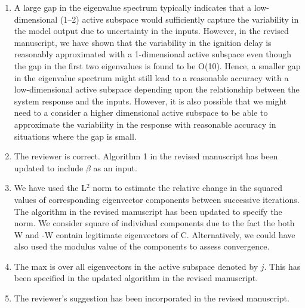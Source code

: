 \documentclass[11pt,final]{article}
\newcommand{\referee}[1]{\vspace{.1ex}\noindent{\textcolor{blue}{#1}}}
\begin{document}
\begin{enumerate}[wide, labelwidth=!, labelindent=0pt]
\item \referee{10.56: what if there is no eigenvalue gap of O(100)?}

\noindent A large gap in the eigenvalue spectrum typically indicates that a low-dimensional (1--2) active subspace 
would sufficiently capture the variability in the model output due to uncertainty in the inputs. However,
in the revised manuscript, we have shown that the variability in the ignition delay is reasonably
approximated with a 1-dimensional active subspace even though the gap in the first two eigenvalues
is found to be O(10). Hence, a smaller gap in the eigenvalue spectrum might still lead to a reasonable
accuracy with a low-dimensional active subspace depending upon the relationship between the
system response and the inputs. However, it is also possible that we might need to a consider a higher 
dimensional active subspace to be able to approximate the variability in the response with reasonable
accuracy in situations where the gap is small. 

\item \referee{11.33: Alg. 1: should have $\beta$ as input, too?}

\noindent The reviewer is correct. Algorithm 1 in the revised manuscript has been updated to include $\beta$
as an input. 

\item \referee{11.42: Which norm is used? Any intuition why squares of W are used, and not just W?}

\noindent We have used the L$^2$ norm to estimate the relative change in the squared values of corresponding
eigenvector components between successive iterations. The algorithm in the revised manuscript has been updated 
to specify the norm. 
We consider square of individual components due to the fact the both W and -W contain legitimate eigenvectors 
of C. Alternatively, we could have also used the modulus value of the components to assess convergence. 

\item \referee{11.45: what is max over?}

\noindent The max is over all eigenvectors in the active subspace denoted by $j$. This has been specified in
the updated algorithm in the revised manuscript.

\item \referee{12.29: 'higher-order' should be replaced with higher-index or smaller-magnitude, to avoid confusion.}

\noindent The reviewer's suggestion has been incorporated in the revised manuscript.


\end{enumerate}
\end{document}
